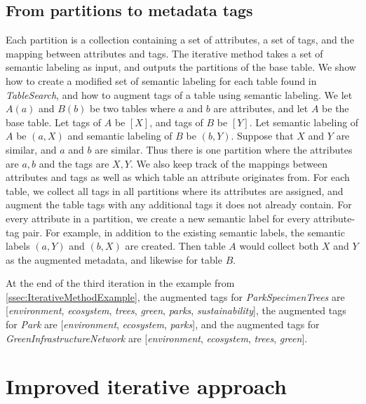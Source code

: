 \subsection{From partitions to metadata tags}
\label{ssec:FromPartitionsToMetadataTags}

Each partition is a collection containing a set of attributes, a set of tags, and the mapping between attributes and tags. The iterative method takes a set of semantic labeling as input, and outputs the partitions of the base table. We show how to create a modified set of semantic labeling for each table found in \textit{TableSearch}, and how to augment tags of a table using semantic labeling. We let $A(a)$ and $B(b)$ be two tables where $a$ and $b$ are attributes, and let $A$ be the base table. Let tags of $A$ be $[X]$, and tags of $B$ be $[Y]$. Let semantic labeling of $A$ be ${(a, X)}$ and semantic labeling of $B$ be ${(b, Y)}$. Suppose that $X$ and $Y$ are similar, and $a$ and $b$ are similar. Thus there is one partition where the attributes are ${a, b}$ and the tags are ${X, Y}$. We also keep track of the mappings between attributes and tags as well as which table an attribute originates from. For each table, we collect all tags in all partitions where its attributes are assigned, and augment the table tags with any additional tags it does not already contain. For every attribute in a partition, we create a new semantic label for every attribute-tag pair. For example, in addition to the existing semantic labels, the semantic labels $(a, Y)$ and $(b, X)$ are created. Then table $A$ would collect both $X$ and $Y$ as the augmented metadata, and likewise for table $B$.

At the end of the third iteration in the example from \autoref{ssec:IterativeMethodExample}, the augmented tags for \textit{ParkSpecimenTrees} are [\textit{environment}, \textit{ecosystem}, \textit{trees}, \textit{green}, \textit{parks}, \textit{sustainability}], the augmented tags for \textit{Park} are [\textit{environment}, \textit{ecosystem}, \textit{parks}], and the augmented tags for \textit{GreenInfrastructureNetwork} are [\textit{environment}, \textit{ecosystem}, \textit{trees}, \textit{green}].

\section{Improved iterative approach}
\label{sec:ImprovedIterativeApproach}

